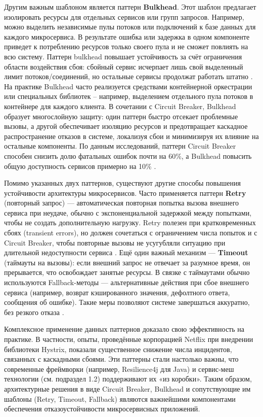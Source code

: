 Другим важным шаблоном является паттерн \textbf{Bulkhead}. Этот шаблон предлагает изолировать ресурсы для отдельных сервисов или групп запросов. Например, можно выделить независимые пулы потоков или подключений к базе данных для каждого микросервиса. В результате ошибка или задержка в одном компоненте приведет к потреблению ресурсов только своего пула и не сможет повлиять на всю систему. Паттерн bulkhead повышает устойчивость за счёт ограничения области воздействия сбоя: сбойный сервис исчерпает лишь свой выделенный лимит потоков/соединений, но остальные сервисы продолжат работать штатно \cite{IEEE2023}. На практике Bulkhead часто реализуется средствами контейнерной оркестрации или специальных библиотек – например, выделением отдельного пула потоков в контейнере для каждого клиента. В сочетании с Circuit Breaker, Bulkhead образует многослойную защиту: один паттерн быстро отсекает проблемные вызовы, а другой обеспечивает изоляцию ресурсов и предотвращает каскадное распространение отказов в системе, локализуя сбои и минимизируя их влияние на остальные компоненты. По данным исследований, паттерн Circuit Breaker способен снизить долю фатальных ошибок почти на 60\%, а Bulkhead повысить общую доступность сервисов примерно на 10\% \cite{IEEE2023}.

Помимо указанных двух паттернов, существуют другие способы повышения устойчивости архитектуры микросервисов. Часто применяется паттерн \textbf{Retry} (повторный запрос) --- автоматическая повторная попытка вызова внешнего сервиса при неудаче, обычно с экспоненциальной задержкой между попытками, чтобы не создать дополнительную нагрузку. Retry полезен при кратковременных сбоях (transient errors), но должен сочетаться с ограничением числа попыток и с Circuit Breaker, чтобы повторные вызовы не усугубляли ситуацию при длительной недоступности сервиса \cite{Punithavathy2024}. Ещё один важный механизм --- \textbf{Timeout} (таймауты на вызовы): если внешний запрос не отвечает за разумное время, он прерывается, что освобождает занятые ресурсы. В связке с таймаутами обычно используются Fallback-методы --- альтернативные действия при сбое внешнего сервиса (например, возврат кэшированного значения, дефолтного ответа, сообщения об ошибке). Такие меры позволяют системе завершаться аккуратно, без резкого отказа \cite{Nygard2018}.

Комплексное применение данных паттернов доказало свою эффективность на практике. В частности, опыты, проведённые корпорацией Netflix при внедрении библиотеки Hystrix, показали существенное снижение числа инцидентов, связанных с каскадными сбоями. Эти паттерны стали настолько важны, что современные фреймворки (например, Resilience4j для Java) и сервис-меш технологии (см. подраздел 1.2) поддерживают их «из коробки». Таким образом, архитектурные решения в виде Circuit Breaker, Bulkhead и сопутствующие им шаблоны (Retry, Timeout, Fallback) являются важнейшими компонентами обеспечения отказоустойчивости микросервисных приложений\cite{patternsraj}.

